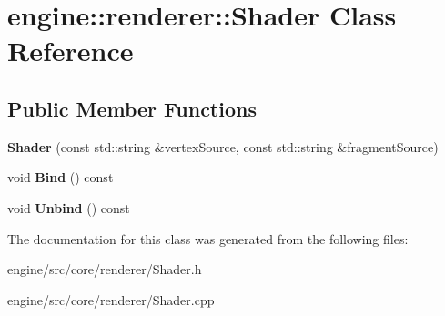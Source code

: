\hypertarget{classengine_1_1renderer_1_1Shader}{}\section{engine\+:\+:renderer\+:\+:Shader Class Reference}
\label{classengine_1_1renderer_1_1Shader}
\subsection*{Public Member Functions}
\begin{DoxyCompactItemize}
\item 
\mbox{\label{classengine_1_1renderer_1_1Shader_a48fb2f9ae7b37051093275c2ecbbae9e}} 
{\bfseries Shader} (const std\+::string \&vertex\+Source, const std\+::string \&fragment\+Source)
\item 
\mbox{\label{classengine_1_1renderer_1_1Shader_ada9e74af27cf5dec958de71bc6aa0366}} 
void {\bfseries Bind} () const
\item 
\mbox{\label{classengine_1_1renderer_1_1Shader_aa129bc5d8c6fb821eacd9ebab21793b6}} 
void {\bfseries Unbind} () const
\end{DoxyCompactItemize}


The documentation for this class was generated from the following files\+:\begin{DoxyCompactItemize}
\item 
engine/src/core/renderer/Shader.\+h\item 
engine/src/core/renderer/Shader.\+cpp\end{DoxyCompactItemize}
